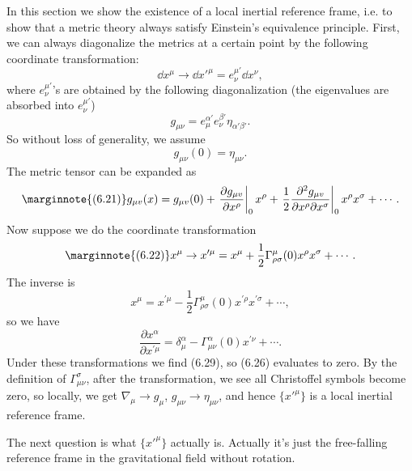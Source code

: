 \documentclass[hyperref, a4paper]{article}
\begin{document}
In this section we show the existence of a local inertial reference frame, i.e. to show that a metric theory 
always satisfy Einstein's equivalence principle. First, we can always diagonalize the metrics at a certain point
by the following coordinate transformation:
\begin{equation}
    \dd{x^\mu} \to \dd{x'^\mu} = e^{\mu'}_\nu \dd{x^\nu},
\end{equation}
where $e^{\mu'}_\nu$'s are obtained by the following diagonalization 
(the eigenvalues are absorbed into $e^{\mu'}_\nu$)
\begin{equation}
    g_{\mu \nu} = e^{\alpha'}_\mu e^{\beta'}_\nu \eta_{\alpha' \beta'}.
\end{equation}
So without loss of generality, we assume 
\begin{equation}
    g_{\mu \nu}(0) = \eta_{\mu \nu}.
\end{equation}
The metric tensor can be expanded as 
\begin{equation} \marginnote{(6.21)}
    g_{\mu v}(x)=g_{\mu v}(0)+\left.\frac{\partial g_{\mu v}}{\partial x^{\rho}}\right|_{0} x^{\rho}+\left.\frac{1}{2} \frac{\partial^{2} g_{\mu v}}{\partial x^{\rho} \partial x^{\sigma}}\right|_{0} x^{\rho} x^{\sigma}+\cdots.
\end{equation}
Now suppose we do the coordinate transformation 
\begin{equation} \marginnote{(6.22)}
    x^{\mu} \rightarrow x^{\prime \mu}=x^{\mu}+\frac{1}{2} \Gamma_{\rho \sigma}^{\mu}(0) x^{\rho} x^{\sigma} + \cdots.
\end{equation}
The inverse is 
\begin{equation}
    x^{\mu}=x^{\prime \mu}-\frac{1}{2} \Gamma_{\rho \sigma}^{\mu}(0) x^{\prime \rho} x^{\prime \sigma}+\cdots,
\end{equation}
so we have 
\begin{equation}
    \frac{\partial x^{\alpha}}{\partial x^{\prime \mu}}=\delta_{\mu}^{\alpha}-\Gamma_{\mu \nu}^{\alpha}(0) x^{\prime \nu}+\cdots.
\end{equation}
Under these transformations we find (6.29), so (6.26) evaluates to zero. 
By the definition of $\Gamma^\sigma_{\mu \nu}$, after the transformation, we see all Christoffel symbols become zero, so locally, we get $\nabla_\mu \to g_\mu$, $g_{\mu \nu} \to \eta_{\mu \nu}$, and hence $\{x'^\mu\}$
is a local inertial reference frame.

The next question is what $\{x'^\mu\}$ actually is. Actually it's just the free-falling reference frame 
in the gravitational field without rotation. %
\end{document}
